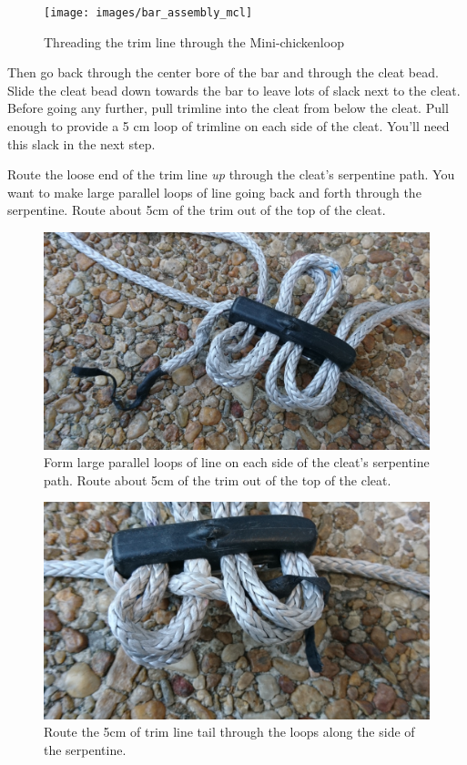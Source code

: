 \documentclass[
]{book}
\begin{document}
\begin{figure}

{\centering \texttt{[image: images/bar\_assembly\_mcl]} 

}

\caption{Threading the trim line through the Mini-chickenloop}\label{fig:bar-assembly-mcl}
\end{figure}

Then go back through the center bore of the bar and through the cleat bead. Slide the cleat bead down towards the bar to leave lots of slack next to the cleat. Before going any further, pull trimline into the cleat from below the cleat. Pull enough to provide a 5 cm loop of trimline on each side of the cleat. You'll need this slack in the next step.

Route the loose end of the trim line \emph{up} through the cleat's serpentine path. You want to make large parallel loops of line going back and forth through the serpentine. Route about 5cm of the trim out of the top of the cleat.

\begin{figure}

{\centering \includegraphics[width=0.7\linewidth]{images/threading_the_cleat_1} 

}

\caption{Form large parallel loops of line on each side of the cleat's serpentine path. Route about 5cm of the trim out of the top of the cleat.}\label{fig:thread-cleat-1}
\end{figure}

\begin{figure}

{\centering \includegraphics[width=0.7\linewidth]{images/threading_the_cleat_2} 

}

\caption{Route the 5cm of trim line tail through the loops along the side of the serpentine.}\label{fig:thread-cleat-2}
\end{figure}
\end{document}
